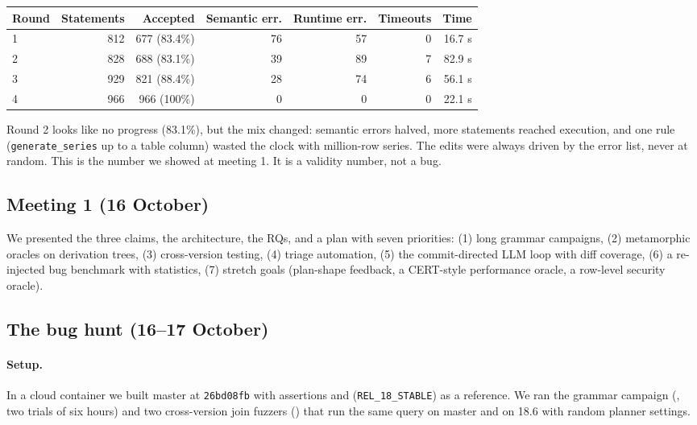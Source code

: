 \begin{center}
\begin{tabular}{lrrrrrr}
\toprule
Round & Statements & Accepted & Semantic err. & Runtime err. & Timeouts & Time \\
\midrule
1 & 812 & 677 (83.4\%) & 76 & 57 & 0 & 16.7 s \\
2 & 828 & 688 (83.1\%) & 39 & 89 & 7 & 82.9 s \\
3 & 929 & 821 (88.4\%) & 28 & 74 & 6 & 56.1 s \\
4 & 966 & 966 (100\%) & 0 & 0 & 0 & 22.1 s \\
\bottomrule
\end{tabular}
\end{center}

Round 2 looks like no progress (83.1\%), but the mix changed: semantic errors
halved, more statements reached execution, and one rule (\texttt{generate\_series}
up to a table column) wasted the clock with million-row series. The edits
were always driven by the error list, never at random. This is the number we
showed at meeting 1. It is a validity number, not a bug.

\subsection{Meeting 1 (16 October)}

We presented the three claims, the architecture, the RQs, and a plan with
seven priorities: (1) long grammar campaigns, (2) metamorphic oracles on
derivation trees, (3) cross-version testing, (4) triage automation, (5) the
commit-directed LLM loop with diff coverage, (6) a re-injected bug benchmark
with statistics, (7) stretch goals (plan-shape feedback, a CERT-style
performance oracle, a row-level security oracle).

\subsection{The bug hunt (16--17 October)}

\paragraph{Setup.} In a cloud container we built \pg master at
\texttt{26bd08fb} with assertions and  (\texttt{REL\_18\_STABLE}) as a
reference. We ran the grammar campaign (, two
trials of six hours) and two cross-version join fuzzers
() that run the same query on master and on
18.6 with random planner settings.

